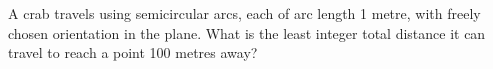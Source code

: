 A crab travels using semicircular arcs, each of arc length 1 metre, with freely chosen orientation in the plane. What is the least integer total distance it can travel to reach a point 100 metres away?
